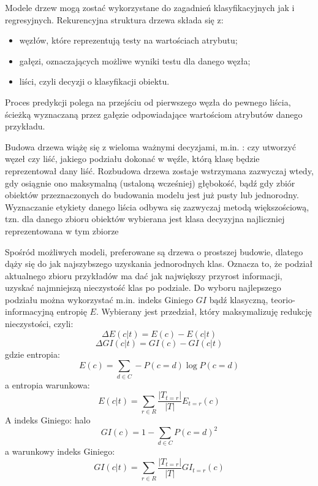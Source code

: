 Modele drzew mogą zostać wykorzystane do zagadnień klasyfikacyjnych jak i regresyjnych.
Rekurencyjna struktura drzewa składa się z:
\begin{itemize}
    \item węzłów, które reprezentują testy na wartościach atrybutu;
    \item gałęzi, oznaczających możliwe wyniki testu dla danego węzła;
    \item liści, czyli decyzji o klasyfikacji obiektu.
\end{itemize}
Proces predykcji polega na przejściu od pierwszego węzła do pewnego liścia, ścieżką wyznaczaną przez gałęzie odpowiadające wartościom atrybutów danego przykładu.

Budowa drzewa wiążę się z wieloma ważnymi decyzjami, m.in. : czy utworzyć węzeł czy liść,  jakiego podziału dokonać w węźle, którą klasę będzie reprezentował dany liść. Rozbudowa drzewa zostaje wstrzymana zazwyczaj wtedy, gdy osiągnie ono maksymalną (ustaloną wcześniej) głębokość, bądź gdy zbiór obiektów przeznaczonych do budowania modelu jest już pusty lub jednorodny. Wyznaczanie etykiety danego liścia odbywa się zazwyczaj metodą większościową, tzn.  dla danego zbioru obiektów wybierana jest klasa
decyzyjna najliczniej reprezentowana w tym zbiorze

Spośród możliwych modeli, preferowane są drzewa o prostszej budowie, dlatego dąży się do jak najszybszego uzyskania jednorodnych klas. Oznacza to, że podział aktualnego zbioru przykładów ma dać jak największy przyrost informacji, uzyskać najmniejszą nieczystość
klas po podziale. Do wyboru najlepszego podziału można wykorzystać m.in. indeks Giniego $GI$ bądź klasyczną, teorio-informacyjną entropię $E$. Wybierany jest przedział, który maksymalizuję redukcję nieczystości, czyli:
\begin{equation}
    \Delta E(c|t) = E(c)-E(c|t)
\end{equation}
\begin{equation}
 \Delta GI(c|t) = GI(c)-GI(c|t)      
 \end{equation}
gdzie 
entropia:
\begin{equation}
    E(c) = \sum_{d\in C} - P(c=d)\log P(c=d)
\end{equation}
a entropia warunkowa:
\begin{equation}
    E(c|t) = \sum_{r\in R} \frac{|T_{t=r}|}{|T|}E_{t=r}(c)
\end{equation}
A indeks Giniego:
halo
\begin{equation}
    GI(c) = 1- \sum_{d\in C}P(c=d)^2
\end{equation}
a warunkowy indeks Giniego:
\begin{equation}
      GI(c|t) = \sum_{r\in R} \frac{|T_{t=r}|}{|T|}GI_{t=r}(c)
\end{equation}

